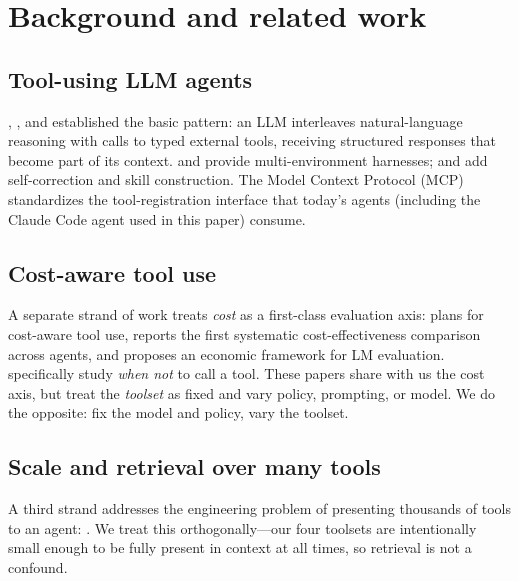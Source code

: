 \documentclass[11pt,letterpaper]{article}
\begin{document}
\section{Background and related work}
\label{sec:related}

\subsection{Tool-using LLM agents}

\citet{yao2022react}, \citet{schick2023toolformer}, and
\citet{qin2023toolllm} established the basic pattern: an LLM
interleaves natural-language reasoning with calls to typed external
tools, receiving structured responses that become part of its
context. \citet{liu2023agentbench} and \citet{yao2024taubench}
provide multi-environment harnesses; \citet{shinn2023reflexion} and
\citet{wang2023voyager} add self-correction and skill construction.
The Model Context Protocol (MCP) standardizes the tool-registration
interface that today's agents (including the Claude Code agent used
in this paper) consume.

\subsection{Cost-aware tool use}

A separate strand of work treats \emph{cost} as a first-class
evaluation axis: \citet{wu2024catp} plans for cost-aware tool use,
\citet{wang2025efficient} reports the first systematic
cost-effectiveness comparison across agents, and
\citet{erol2025costofpass} proposes an economic framework for LM
evaluation. \citet{ross2025when2call} specifically study \emph{when
not} to call a tool. These papers share with us the cost axis, but
treat the \emph{toolset} as fixed and vary policy, prompting, or
model. We do the opposite: fix the model and policy, vary the
toolset.

\subsection{Scale and retrieval over many tools}

A third strand addresses the engineering problem of presenting
thousands of tools to an agent: \citet{du2024anytool,
lumer2024toolshed, liu2025toolscope, esfandiarpoor2025mcpcompany,
guo2025mcpagentbench}. We treat this orthogonally---our four
toolsets are intentionally small enough to be fully present in
context at all times, so retrieval is not a confound.
\end{document}

